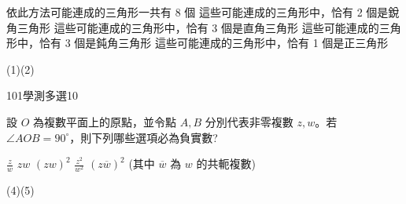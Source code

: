 \begin{QUESTIONS}
\begin{QUESTION}
\begin{QBODY}
			\begin{QOPS} 
				\QOP 依此方法可能連成的三角形一共有 8 個
				\QOP 這些可能連成的三角形中，恰有 2 個是銳角三角形 \QOP 這些可能連成的三角形中，恰有 3 個是直角三角形
				\QOP 這些可能連成的三角形中，恰有 3 個是鈍角三角形
				\QOP 這些可能連成的三角形中，恰有 1 個是正三角形
			\end{QOPS}
        \end{QBODY}
        \begin{QFROMS}
        \end{QFROMS}
        \begin{QTAGS}\end{QTAGS}
        \begin{QANS}
            (1)(2)
        \end{QANS}
        \begin{QSOLLIST}
        \end{QSOLLIST}
        \begin{QEMPTYSPACE}
        \end{QEMPTYSPACE}
    \end{QUESTION}
    \begin{QUESTION}
        \begin{ExamInfo}{101}{學測}{多選}{10}
        \end{ExamInfo}
        \begin{ExamAnsRateInfo}{36}{66}{27}{15}
        \end{ExamAnsRateInfo}
        \begin{QBODY}
            設 $O$ 為複數平面上的原點，並令點 $A,B$ 分別代表非零複數 $z,w$。若 $\angle AOB = 90^\circ$，則下列哪些選項必為負實數?
		\begin{QOPS} 
			\QOP $\frac{z}{w}$    
			\QOP $zw$    
			\QOP $(zw)^2$ 
			\QOP $\frac{z^2}{w^2}$ 
			\QOP $(z\overline{w})^2$ (其中 $\overline{w}$ 為 $w$ 的共軛複數)
		\end{QOPS}
        \end{QBODY}
        \begin{QFROMS}
        \end{QFROMS}
        \begin{QTAGS}\end{QTAGS}
        \begin{QANS}
            (4)(5)
        \end{QANS}
        \begin{QSOLLIST}
        \end{QSOLLIST}

\end{QUESTION}
\end{QUESTIONS}
